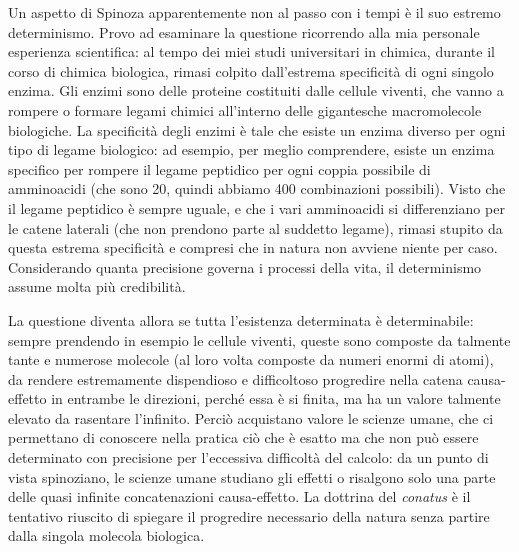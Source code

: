 Un aspetto di Spinoza apparentemente non al passo con i tempi è il suo estremo determinismo. Provo ad esaminare la questione ricorrendo alla mia personale esperienza scientifica: al tempo dei miei studi universitari in chimica, durante il corso di chimica biologica, rimasi colpito dall'estrema specificità di ogni singolo enzima. Gli enzimi sono delle proteine costituiti dalle cellule viventi, che vanno a rompere o formare legami chimici all'interno delle gigantesche macromolecole biologiche. La specificità degli enzimi è tale che esiste un enzima diverso per ogni tipo di legame biologico: ad esempio, per meglio comprendere, esiste un enzima specifico per rompere il legame peptidico per ogni coppia possibile di amminoacidi (che sono 20, quindi abbiamo 400 combinazioni possibili). Visto che il legame peptidico è sempre uguale, e che i vari amminoacidi si differenziano per le catene laterali (che non prendono parte al suddetto legame), rimasi stupito da questa estrema specificità e compresi che in natura non avviene niente per caso. Considerando quanta precisione  governa i processi della vita, il determinismo assume molta più credibilità.

La questione diventa allora se tutta l'esistenza determinata è determinabile: sempre prendendo in esempio le cellule viventi, queste sono composte da talmente tante e numerose molecole (al loro volta composte da numeri enormi di atomi), da rendere estremamente dispendioso e difficoltoso progredire nella catena causa-effetto in entrambe le direzioni, perché essa è si finita, ma ha un valore talmente elevato da rasentare l'infinito. Perciò acquistano valore le scienze umane, che ci permettano di conoscere nella pratica ciò che è esatto ma che non può essere determinato con precisione per l'eccessiva difficoltà del calcolo: da un punto di vista spinoziano, le scienze umane studiano gli effetti o risalgono solo una parte delle quasi infinite concatenazioni causa-effetto. La dottrina del \textit{conatus} è il tentativo riuscito di spiegare il progredire necessario della natura senza partire dalla singola molecola biologica.














\newpage